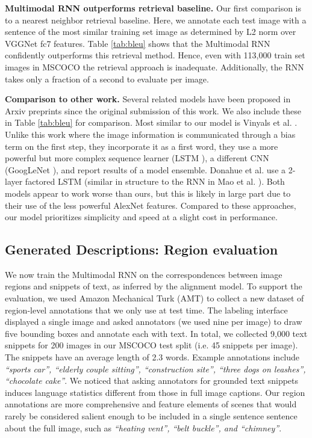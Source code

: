 \documentclass[10pt,twocolumn,letterpaper]{article}
\begin{document}
\textbf{Multimodal RNN outperforms retrieval baseline.} Our first comparison is to a nearest neighbor retrieval baseline. Here, we annotate each test image with a sentence of the most similar training set image as determined by L2 norm over VGGNet \cite{simonyan2014very} fc7 features. Table \ref{tab:bleu} shows that the Multimodal RNN confidently outperforms this retrieval method. Hence, even with 113,000 train set images in MSCOCO the retrieval approach is inadequate. Additionally, the RNN takes only a fraction of a second to evaluate per image.

\textbf{Comparison to other work.} Several related models have been proposed in Arxiv preprints since the original submission of this work. We also include these in Table \ref{tab:bleu} for comparison. Most similar to our model is Vinyals et al. \cite{vinyals2014show}. Unlike this work where the image information is communicated through a bias term on the first step, they incorporate it as a first word, they use a more powerful but more complex sequence learner (LSTM \cite{hochreiter1997long}), a different CNN (GoogLeNet \cite{szegedy2014going}), and report results of a model ensemble.  Donahue et al. \cite{donahue2014long} use a 2-layer factored LSTM (similar in structure to the RNN in Mao et al. \cite{mao2014explain}). Both models appear to work worse than ours, but this is likely in large part due to their use of the less powerful AlexNet \cite{krizhevsky2012imagenet} features. Compared to these approaches, our model prioritizes simplicity and speed at a slight cost in performance.

\vspace{-0.1in}
\subsection{Generated Descriptions: Region evaluation}
\vspace{-0.15in}

We now train the Multimodal RNN on the correspondences between image regions and snippets of text, as inferred by the alignment model. To support the evaluation, we used Amazon Mechanical Turk (AMT) to collect a new dataset of region-level annotations that we only use at test time. The labeling interface displayed a single image and asked annotators (we used nine per image) to draw five bounding boxes and annotate each with text. In total, we collected 9,000 text snippets for 200 images in our MSCOCO test split (i.e. 45 snippets per image). The snippets have an average length of 2.3 words. Example annotations include \textit{``sports car'', ``elderly couple sitting'', ``construction site'', ``three dogs on leashes'', ``chocolate cake''}. We noticed that asking annotators for grounded text snippets induces language statistics different from those in full image captions. Our region annotations are more comprehensive and feature elements of scenes that would rarely be considered salient enough to be included in a single sentence sentence about the full image, such as \textit{``heating vent'', ``belt buckle'', and ``chimney''}.
\end{document}
